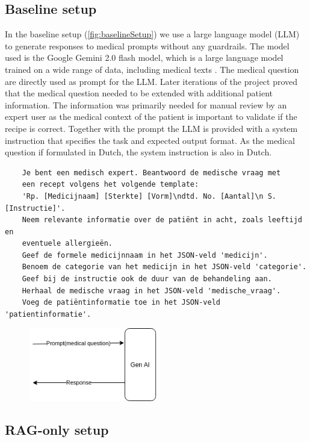 \subsection{Baseline setup}
In the baseline setup (\autoref{fig:baselineSetup}) we use a large language model (LLM) to generate responses to medical prompts without any guardrails.
The model used is the Google Gemini 2.0 flash model, which is a large language model trained on a wide range of data, including medical texts \citep{saab2024capabilities}.
The medical question are directly used as prompt for the LLM.
Later iterations of the project proved that the medical question needed to be extended with additional patient information.
The information was primarily needed for manual review by an expert user as the medical context of the patient is important to validate if the recipe is correct.
Together with the prompt the LLM is provided with a system instruction that specifies the task and expected output format.
As the medical question if formulated in Dutch, the system instruction is also in Dutch.
\begin{verbatim}
    Je bent een medisch expert. Beantwoord de medische vraag met
    een recept volgens het volgende template:
    'Rp. [Medicijnaam] [Sterkte] [Vorm]\ndtd. No. [Aantal]\n S. [Instructie]'.
    Neem relevante informatie over de patiënt in acht, zoals leeftijd en
    eventuele allergieën.
    Geef de formele medicijnnaam in het JSON-veld 'medicijn'.
    Benoem de categorie van het medicijn in het JSON-veld 'categorie'.
    Geef bij de instructie ook de duur van de behandeling aan.
    Herhaal de medische vraag in het JSON-veld 'medische_vraag'.
    Voeg de patiëntinformatie toe in het JSON-veld 'patientinformatie'.
\end{verbatim}

\begin{figure}[H]
    \includegraphics[width=0.5\textwidth]{figures/baselineSetup.png}
    \label{fig:baselineSetup}
\end{figure}

\subsection{RAG-only setup}

